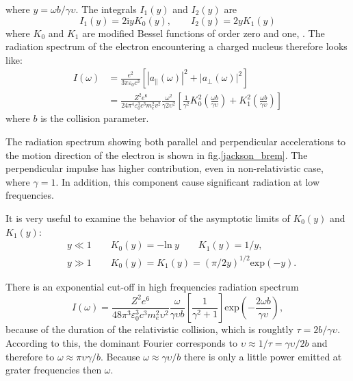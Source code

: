 \documentclass[oneside,a4paper,11pt]{report}
\begin{document}
where $y = \omega b / \gamma \upsilon$. The integrals $I_1(y)$ and $I_2(y)$ are
\begin{equation}
 \label{bremr_int}
I_1(y) = 2 \mathrm{i} y K_0 (y), \qquad I_2(y) = 2y K_1 (y)
\end{equation}
where $K_0$ and $K_1$ are modified Bessel functions of order zero and one, \citet{longair:1}.
The radiation spectrum of the electron encountering a charged nucleus therefore looks like: 
\begin{equation}
 \label{rad_spec_brem}
\begin{split}
I(\omega) &= \frac{e^2}{3\pi \varepsilon_0 c^3}\left [ \left | a_\parallel (\omega) \right |^2 + \left | a_\perp (\omega) \right |^2 \right ] \\
&= \frac{Z^2e^6}{24\pi^4 \varepsilon_0^3 c^3 m_e^2 v^2} \frac{\omega^2}{\gamma2 \upsilon^2}\left [ \frac{1}{\gamma^2}K_0^2\left ( \frac{\omega b}{\gamma \upsilon} \right ) + K_1^2 \left ( \frac{\omega b}{\gamma \upsilon} \right ) \right ] 
\end{split}
\end{equation}
where $b$ is the collision parameter. 

The radiation spectrum showing both parallel and perpendicular accelerations to the motion 
direction of the electron is shown in fig.\ref{jackson_brem}. The perpendicular impulse 
has higher contribution, even in non-relativistic case, where $\gamma = 1$.  In addition, 
this component cause significant radiation at low frequencies.   

It is very useful to examine the behavior of the asymptotic limits of $K_0(y)$ and $K_1(y)$: 
\begin{equation}
 \label{examine_k}
\begin{split}
&y \ll 1 \qquad K_0(y) = -\mathrm{ln} \: y \qquad K_1(y) = 1/y , \\
&y \gg 1 \qquad  K_0(y) =  K_1(y) = (\pi/2y)^{1/2} \mathrm{exp}(-y).    
\end{split}
\end{equation}

There is an exponential cut-off in high frequencies radiation spectrum
\begin{equation}
\label{high_f}
I(\omega) = \frac{Z^2 e^6}{48 \pi^3 \varepsilon_0^3 c^3 m_e^2 \upsilon^2 } \frac{\omega}{\gamma \upsilon b} \left [ \frac{1}{\gamma^2 +1} \right ] \mathrm{exp}\left ( - \frac{2 \omega b}{\gamma \upsilon} \right ), 
\end{equation}
because of the duration of the relativistic collision, 
which is roughtly $\tau = 2b / \gamma \upsilon$. According to this, the dominant Fourier corresponds to 
$\upsilon \approx 1/ \tau = \gamma \upsilon / 2b$ and therefore to $\omega \approx \pi \upsilon \gamma / b$. 
Because $\omega \approx \gamma \upsilon / b$ there is only a little power emitted at grater frequencies 
then $\omega$. 
\end{document}
